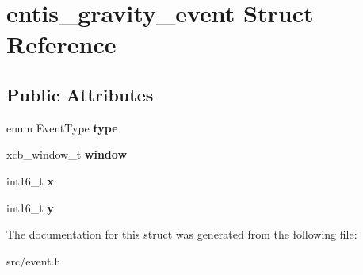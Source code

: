 \hypertarget{structentis__gravity__event}{}\section{entis\+\_\+gravity\+\_\+event Struct Reference}
\label{structentis__gravity__event}
\subsection*{Public Attributes}
\begin{DoxyCompactItemize}
\item 
\mbox{\label{structentis__gravity__event_a3c2d0cc34830a0100f6769db0575c97e}} 
enum Event\+Type {\bfseries type}
\item 
\mbox{\label{structentis__gravity__event_ae45acbd1e3872c0afaf3792e6aba3728}} 
xcb\+\_\+window\+\_\+t {\bfseries window}
\item 
\mbox{\label{structentis__gravity__event_a9b7a307a6396a405770a68ca9c42d726}} 
int16\+\_\+t {\bfseries x}
\item 
\mbox{\label{structentis__gravity__event_a811e7ee3e2319d71a4e85862c6390fe8}} 
int16\+\_\+t {\bfseries y}
\end{DoxyCompactItemize}


The documentation for this struct was generated from the following file\+:\begin{DoxyCompactItemize}
\item 
src/event.\+h\end{DoxyCompactItemize}
